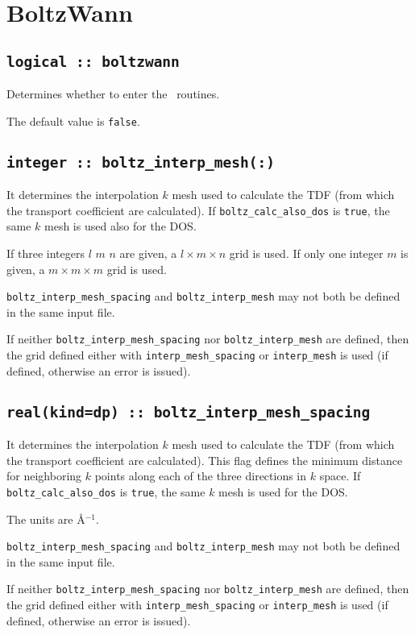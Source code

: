 \clearpage
\section{BoltzWann}
\subsection[boltzwann]{\tt logical :: boltzwann}
Determines whether to enter the \bw\ routines.

The default value is \verb#false#.

\subsection[boltz\_interp\_mesh]{\tt integer :: boltz\_interp\_mesh(:)}
It determines the interpolation $k$ mesh used to calculate the TDF (from which the transport coefficient are calculated). If {\tt boltz\_calc\_also\_dos} is \verb#true#, the same $k$ mesh is used also for the DOS.

If three integers $l$ $m$ $n$ are given, a $l\times m\times n$ grid is used. If only one integer $m$ is given, a $m\times m\times m$ grid is used.

{\tt boltz\_interp\_mesh\_spacing} and  {\tt boltz\_interp\_mesh} may not both be defined in the same input file.

If neither {\tt boltz\_interp\_mesh\_spacing} nor  {\tt boltz\_interp\_mesh} are defined, then the grid defined either with {\tt interp\_mesh\_spacing} or {\tt interp\_mesh} is used (if defined, otherwise an error is issued).

\subsection[boltz\_interp\_mesh\_spacing]{\tt real(kind=dp) :: boltz\_interp\_mesh\_spacing}
It determines the interpolation $k$ mesh used to calculate the TDF (from which the transport coefficient are calculated). This flag defines the minimum distance for neighboring $k$ points along each of the three directions in $k$ space. If {\tt boltz\_calc\_also\_dos} is \verb#true#, the same $k$ mesh is used for the DOS.

The units are \AA$^{-1}$.

{\tt boltz\_interp\_mesh\_spacing} and  {\tt boltz\_interp\_mesh} may not both be defined in the same input file.

If neither {\tt boltz\_interp\_mesh\_spacing} nor  {\tt boltz\_interp\_mesh} are defined, then the grid defined either with {\tt interp\_mesh\_spacing} or {\tt interp\_mesh} is used (if defined, otherwise an error is issued).

